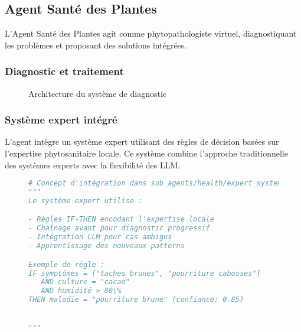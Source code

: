\subsection{Agent Santé des Plantes}

L'Agent Santé des Plantes agit comme phytopathologiste virtuel, diagnostiquant les problèmes et proposant des solutions intégrées.

\subsubsection{Diagnostic et traitement}

\begin{figure}[H]
\centering
{}
\caption{Architecture du système de diagnostic}
\end{figure}

\subsubsection{Système expert intégré}

L'agent intègre un système expert utilisant des règles de décision basées sur l'expertise phytosanitaire locale. Ce système combine l'approche traditionnelle des systèmes experts avec la flexibilité des LLM.

\begin{figure}[H]
\centering
\begin{lstlisting}[language=Python, caption=Intégration système expert (principe)]
# Concept d'intégration dans sub_agents/health/expert_system.py
"""
Le système expert utilise :

- Règles IF-THEN encodant l'expertise locale
- Chaînage avant pour diagnostic progressif
- Intégration LLM pour cas ambigus
- Apprentissage des nouveaux patterns

Exemple de règle :
IF symptômes = ["taches brunes", "pourriture cabosses"]
   AND culture = "cacao"
   AND humidité > 80\%
THEN maladie = "pourriture brune" (confiance: 0.85)


"""
\end{lstlisting}
\end{figure}

